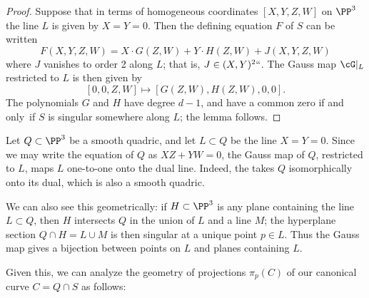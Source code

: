 \begin{proof}
Suppose that in terms of homogeneous coordinates $[X,Y,Z,W]$ on $\PP^3$ the line $L$ is given by $X = Y = 0$. Then the defining equation $F$ of $S$ can be written
$$
F(X,Y,Z,W) = X\cdot G(Z,W) + Y\cdot H(Z,W) + J(X,Y,Z,W)
$$
where $J$ vanishes to order 2 along $L$; that is, $J \in (X,Y)^2` `$. The Gauss map $\cG|_L$ restricted to $L$ is then given by
$$
[0,0,Z,W] \mapsto [G(Z,W), H(Z,W), 0, 0].
$$
The polynomials $G$ and $H$ have degree $d-1$, and have a common zero if and only~if $S$ is singular somewhere along $L$; the lemma follows.
\end{proof}

\begin{example}
\label{Gauss of Quadric}
Let $Q\subset \PP^3$ be a smooth quadric,
and let $L\subset Q$ be the line $X=Y =0$. Since we may write the
equation of $Q$ as $XZ+YW = 0$, the Gauss map of $Q$, restricted to
$L$, maps $L$ one-to-one onto the dual line. Indeed, the
takes $Q$ isomorphically onto its dual, which is also a smooth quadric.

 We can also see this geometrically: if $H \subset \PP^3$ is any plane containing the line $L \subset Q$, then $H$ intersects $Q$ in the union of $L$ and a line $M$; the hyperplane section $Q \cap H = L \cup M$ is then singular at a unique point $p \in L$. Thus the Gauss map gives a bijection between points on $L$ and planes containing $L$.
\unif
\end{example}

Given this, we can analyze the geometry of projections $\pi_p(C)$ of our canonical curve $C = Q \cap S$ as follows:


